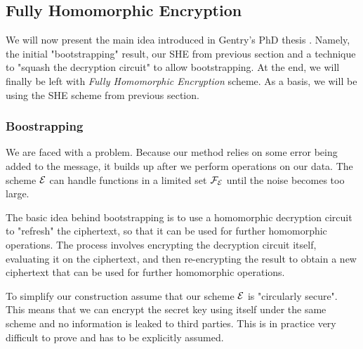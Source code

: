 \subsection{Fully Homomorphic Encryption}
We will now present the main idea introduced in Gentry's PhD thesis \cite{gentry_phd}. Namely, the initial "bootstrapping" result, our SHE from previous section and a technique to "squash the decryption circuit" to allow bootstrapping. At the end, we will finally be left with \textit{Fully Homomorphic Encryption} scheme. As a basis, we will be using the SHE scheme from previous section.

\subsubsection*{Boostrapping}
We are faced with a problem. Because our method relies on some error being added to the message, it builds up after we perform operations on our data. The scheme $\mathcal{E}$ can handle functions in a limited set $\mathcal{F}_{\mathcal{E}}$ until the noise becomes too large.

The basic idea behind bootstrapping is to use a homomorphic decryption circuit to "refresh" the ciphertext, so that it can be used for further homomorphic operations. The process involves encrypting the decryption circuit itself, evaluating it on the ciphertext, and then re-encrypting the result to obtain a new ciphertext that can be used for further homomorphic operations.

To simplify our construction assume that our scheme $\mathcal{E}$ is "circularly secure". This means that we can encrypt the secret key using itself under the same scheme and no information is leaked to third parties. This is in practice very difficult to prove and has to be explicitly assumed. 
